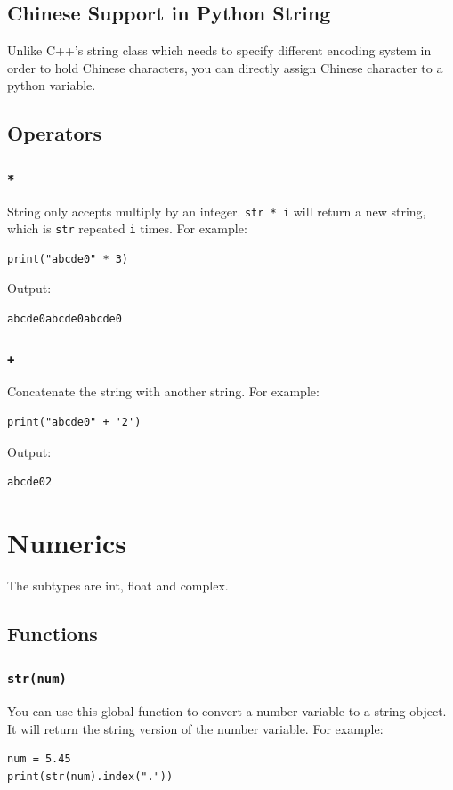 \documentclass[12pt]{book}
\begin{document}
\subsection{Chinese Support in Python String}
\label{sec:orgc2136bf}
Unlike C++'s string class which needs to specify different encoding system in order to hold Chinese characters, you can directly assign Chinese character to a python variable.
\subsection{Operators}
\label{sec:org4cc9b2c}
\subsubsection{\texttt{*}}
\label{sec:org2dbff57}
String only accepts multiply by an integer. \texttt{str * i} will return a new string, which is \texttt{str} repeated \texttt{i} times. For example:
\begin{verbatim}
print("abcde0" * 3)
\end{verbatim}
Output:
\begin{verbatim}
abcde0abcde0abcde0
\end{verbatim}
\subsubsection{\texttt{+}}
\label{sec:orga7b3c8a}
Concatenate the string with another string. For example:
\begin{verbatim}
print("abcde0" + '2')
\end{verbatim}
Output:
\begin{verbatim}
abcde02
\end{verbatim}

\section{Numerics}
\label{sec:org6c055e5}
The subtypes are int, float and complex.
\subsection{Functions}
\label{sec:org3737a36}
\subsubsection{\texttt{str(num)}}
\label{sec:orgf76f7d4}
You can use this global function to convert a number variable to a string object. It will return the string version of the number variable. For example:
\begin{verbatim}
num = 5.45
print(str(num).index("."))
\end{verbatim}
\end{document}
